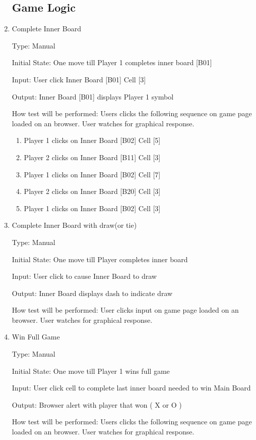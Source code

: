 \documentclass[12pt, titlepage]{article}
\begin{document}
\begin{enumerate}
\subsection{Game Logic}

\item{Complete Inner Board\\}

Type: Manual
					
Initial State: One move till Player 1 completes inner board [B01]
					
Input: User click Inner Board [B01] Cell [3] 
					
Output:  Inner Board [B01] displays Player 1 symbol
					
How test will be performed: Users clicks the following sequence on game page loaded on an browser. User watches for graphical response.
\begin{enumerate}
	\item Player 1 clicks on Inner Board [B02] Cell [5]
	\item Player 2 clicks on Inner Board [B11] Cell [3]
	\item Player 1 clicks on Inner Board [B02] Cell [7]
	\item Player 2 clicks on Inner Board [B20] Cell [3]
	\item Player 1 clicks on Inner Board [B02] Cell [3]
\end{enumerate}

\item{Complete Inner Board with draw(or tie) \\}

Type: Manual
					
Initial State: One move till Player completes inner board
					
Input: User click to cause Inner Board to draw 
					
Output:  Inner Board displays dash to indicate draw
					
How test will be performed: User clicks input on game page loaded on an browser. User watches for graphical response.

\item{Win Full Game\\}

Type: Manual
					
Initial State: One move till Player 1 wins full game
					
Input: User click cell to complete last inner board needed to win Main Board
					
Output:  Browser alert with player that won ( X or O )
					
How test will be performed: Users clicks the following sequence on game page loaded on an browser. User watches for graphical response.

\end{enumerate}
	
\end{document}
